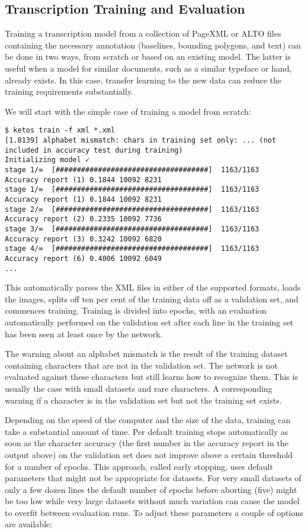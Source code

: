 \subsection{Transcription Training and Evaluation}

Training a transcription model from a collection of PageXML or ALTO files
containing the necessary annotation (baselines, bounding polygons, and text)
can be done in two ways, from scratch or based on an existing model. The latter
is useful when a model for similar documents, such as a similar typeface or
hand, already exists. In this case, transfer learning to the new data can
reduce the training requirements substantially.

We will start with the simple case of training a model from scratch:

\begin{verbatim}
$ ketos train -f xml *.xml
[1.8139] alphabet mismatch: chars in training set only: ... (not included in accuracy test during training)
Initializing model ✓
stage 1/∞  [####################################]  1163/1163          Accuracy report (1) 0.1844 10092 8231
stage 1/∞  [####################################]  1163/1163          Accuracy report (1) 0.1844 10092 8231
stage 2/∞  [####################################]  1163/1163          Accuracy report (2) 0.2335 10092 7736
stage 3/∞  [####################################]  1163/1163          Accuracy report (3) 0.3242 10092 6820
stage 4/∞  [####################################]  1163/1163          Accuracy report (6) 0.4006 10092 6049
...
\end{verbatim}

This automatically parses the XML files in either of the supported formats,
loads the images, splits off ten per cent of the training data off as a
validation set, and commences training. Training is divided into epochs, with
an evaluation automatically performed on the validation set after each line in
the training set has been seen at least once by the network. 

The warning about an alphabet mismatch is the result of the training dataset
containing characters that are not in the validation set. The network is not
evaluated against these characters but still learns how to recognize them. This
is usually the case with small datasets and rare characters. A corresponding
warning if a character is in the validation set but not the training set
exists.

Depending on the speed of the computer and the size of the data, training can
take a substantial amount of time. Per default training stops automatically as
soon as the character accuracy (the first number in the accuracy report in the
output above) on the validation set does not improve above a certain threshold
for a number of epochs. This approach, called early stopping, uses default
parameters that might not be appropriate for datasets.  For very small datasets
of only a few dozen lines the default number of epochs before aborting (five)
might be too low while very large datasets without much variation can cause the
model to overfit between evaluation runs. To adjust these parameters a couple
of options are available:

